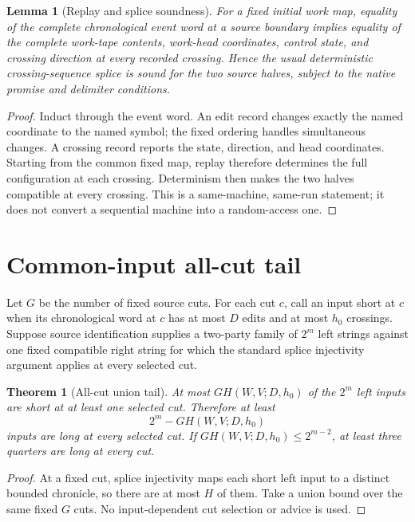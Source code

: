 \documentclass[11pt]{article}
\newtheorem{theorem}{Theorem}
\newtheorem{lemma}{Lemma}
\begin{document}
\begin{lemma}[Replay and splice soundness]
For a fixed initial work map, equality of the complete chronological event word at a source boundary implies equality of the complete work-tape contents, work-head coordinates, control state, and crossing direction at every recorded crossing.  Hence the usual deterministic crossing-sequence splice is sound for the two source halves, subject to the native promise and delimiter conditions.
\end{lemma}

\begin{proof}
Induct through the event word.  An edit record changes exactly the named coordinate to the named symbol; the fixed ordering handles simultaneous changes.  A crossing record reports the state, direction, and head coordinates.  Starting from the common fixed map, replay therefore determines the full configuration at each crossing.  Determinism then makes the two halves compatible at every crossing.  This is a same-machine, same-run statement; it does not convert a sequential machine into a random-access one.
\end{proof}

\section{Common-input all-cut tail}

Let $G$ be the number of fixed source cuts.  For each cut $c$, call an input short at $c$ when its chronological word at $c$ has at most $D$ edits and at most $h_0$ crossings.  Suppose source identification supplies a two-party family of $2^m$ left strings against one fixed compatible right string for which the standard splice injectivity argument applies at every selected cut.

\begin{theorem}[All-cut union tail]
At most $G H(W,V;D,h_0)$ of the $2^m$ left inputs are short at at least one selected cut.  Therefore at least
\[
  2^m-GH(W,V;D,h_0)
\]
inputs are long at every selected cut.  If $GH(W,V;D,h_0)\le 2^{m-2}$, at least three quarters are long at every cut.
\end{theorem}

\begin{proof}
At a fixed cut, splice injectivity maps each short left input to a distinct bounded chronicle, so there are at most $H$ of them.  Take a union bound over the same fixed $G$ cuts.  No input-dependent cut selection or advice is used.
\end{proof}
\end{document}

